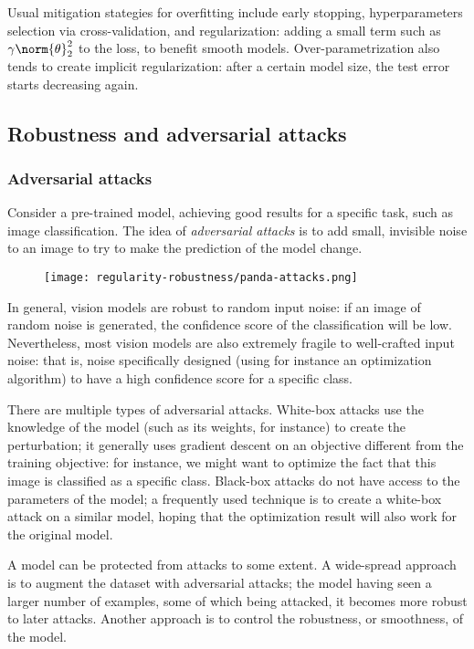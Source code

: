 Usual mitigation stategies for overfitting include early stopping, hyperparameters selection via cross-validation, and regularization: adding a small term such as $\gamma\norm{\theta}_2^2$ to the loss, to benefit smooth models. Over-parametrization also tends to create implicit regularization: after a certain model size, the test error starts decreasing again.

\subsection{Robustness and adversarial attacks}
\subsubsection{Adversarial attacks}
Consider a pre-trained model, achieving good results for a specific task, such as image classification. The idea of \emph{adversarial attacks} is to add small, invisible noise to an image to try to make the prediction of the model change.
\begin{figure}[H]
    \centering
    \texttt{[image: regularity-robustness/panda-attacks.png]}
\end{figure}
In general, vision models are robust to random input noise: if an image of random noise is generated, the confidence score of the classification will be low. Nevertheless, most vision models are also extremely fragile to well-crafted input noise: that is, noise specifically designed (using for instance an optimization algorithm) to have a high confidence score for a specific class.

There are multiple types of adversarial attacks. White-box attacks use the knowledge of the model (such as its weights, for instance) to create the perturbation; it generally uses gradient descent on an objective different from the training objective: for instance, we might want to optimize the fact that this image is classified as a specific class. Black-box attacks do not have access to the parameters of the model; a frequently used technique is to create a white-box attack on a similar model, hoping that the optimization result will also work for the original model.

A model can be protected from attacks to some extent. A wide-spread approach is to augment the dataset with adversarial attacks; the model having seen a larger number of examples, some of which being attacked, it becomes more robust to later attacks. Another approach is to control the robustness, or smoothness, of the model.

